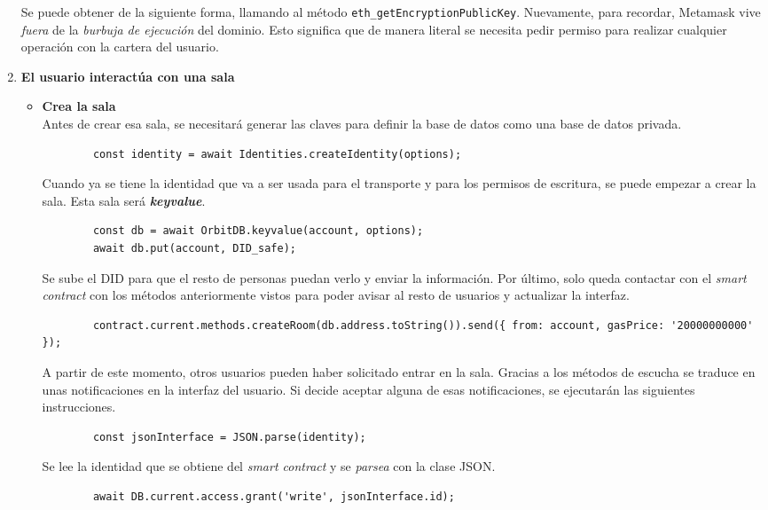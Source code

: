 \begin{enumerate}
    Se puede obtener de la siguiente forma, llamando al método \verb|eth_getEncryptionPublicKey|. Nuevamente, para recordar, Metamask vive \textit{fuera} de la \textit{burbuja de ejecución} del dominio. Esto significa que de manera literal se necesita pedir permiso para realizar cualquier operación con la cartera del usuario.
    \item \textbf{El usuario interactúa con una sala}
    \begin{itemize}
        \item \textbf{Crea la sala}\\
        Antes de crear esa sala, se necesitará generar las claves para definir la base de datos como una base de datos privada.
        \begin{lstlisting}
        const identity = await Identities.createIdentity(options);
        \end{lstlisting}
        Cuando ya se tiene la identidad que va a ser usada para el transporte y para los permisos de escritura, se puede empezar a crear la sala.
        Esta sala será \textbf{\textit{keyvalue}}.
        \begin{lstlisting}
        const db = await OrbitDB.keyvalue(account, options);
        await db.put(account, DID_safe);
        \end{lstlisting}
        Se sube el DID para que el resto de personas puedan verlo y enviar la información.
        Por último, solo queda contactar con el \textit{smart contract} con los métodos anteriormente vistos para poder avisar al resto de usuarios y actualizar la interfaz.
        \begin{lstlisting}
        contract.current.methods.createRoom(db.address.toString()).send({ from: account, gasPrice: '20000000000' });
        \end{lstlisting}
        A partir de este momento, otros usuarios pueden haber solicitado entrar en la sala. Gracias a los métodos de escucha se traduce en unas notificaciones en la interfaz del usuario.
        Si decide aceptar alguna de esas notificaciones, se ejecutarán las siguientes instrucciones.
        \begin{lstlisting}
        const jsonInterface = JSON.parse(identity);
        \end{lstlisting}
        Se lee la identidad que se obtiene del \textit{smart contract} y se \textit{parsea} con la clase JSON.
        \begin{lstlisting}
        await DB.current.access.grant('write', jsonInterface.id);
        \end{lstlisting}

\end{itemize}
\end{enumerate}
